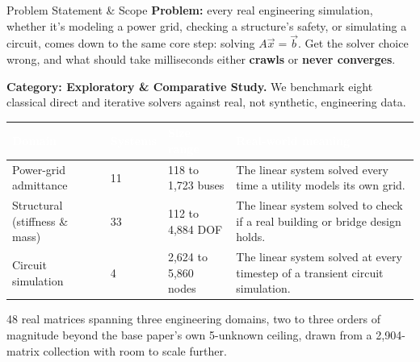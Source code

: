 \documentclass[aspectratio=169,10pt]{beamer}
\newcommand{\gd}[1]{{\color{LSgreen}\bfseries #1}}
\newcommand{\hdrow}{\rowcolor{LSnavy}}
\newcommand{\hdtxt}[1]{\textcolor{white}{\bfseries #1}}
\begin{document}
\begin{frame}{Problem Statement \& Scope}
  \small
  \textbf{Problem:} every real engineering simulation, whether it's modeling
  a power grid, checking a structure's safety, or simulating a circuit,
  comes down to the same core step: solving $A\vec{x}=\vec{b}$. Get the
  solver choice wrong, and what should take milliseconds either \gd{crawls}
  or \textcolor{LSred}{\bfseries never converges}.

  \vspace{0.5em}
  \begin{center}
  \colorbox{LSlightgold}{\parbox{0.92\linewidth}{\centering\footnotesize
  \textbf{Category: Exploratory \& Comparative Study.} We benchmark eight
  classical direct and iterative solvers against real, not synthetic,
  engineering data.}}
  \end{center}

  \vspace{0.7em}
  \renewcommand{\arraystretch}{1.3}
  \begin{tabular}{@{}p{2.9cm}p{1.5cm}p{2.0cm}p{5.0cm}@{}}
    \toprule
    \hdrow \hdtxt{Domain} & \hdtxt{Systems} & \hdtxt{Size range} & \hdtxt{Real-world meaning}\\
    \midrule
    Power-grid admittance & 11 & 118 to 1{,}723 buses & The linear system solved every
      time a utility models its own grid.\\
    \rowcolor{LSlight}
    Structural (stiffness \& mass) & 33 & 112 to 4{,}884 DOF & The linear system solved to check
      if a real building or bridge design holds.\\
    Circuit simulation & 4 & 2{,}624 to 5{,}860 nodes & The linear system solved
      at every timestep of a transient circuit simulation.\\
    \bottomrule
  \end{tabular}

  \vspace{0.6em}
  \footnotesize\color{LSgray}
  48 real matrices spanning three engineering domains, two to three orders of
  magnitude beyond the base paper's own 5-unknown ceiling, drawn from a
  2{,}904-matrix collection with room to scale further.
\end{frame}
\end{document}
